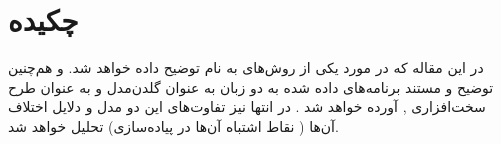 \chapter*{\large چکیده }
\pagestyle{empty}

در این مقاله که در مورد یکی از روش‌های   به نام  توضیح داده خواهد شد. و هم‌چنین توضیح و مستند برنامه‌های داده شده به دو زبان  به عنوان گلدن‌مدل و  به عنوان طرح سخت‌افزاری , آورده خواهد شد .
در انتها نیز تفاوت‌های این دو مدل و دلایل اختلاف آن‌ها (‌ نقاط اشتباه آن‌ها در پیاده‌سازی) تحلیل خواهد شد.
